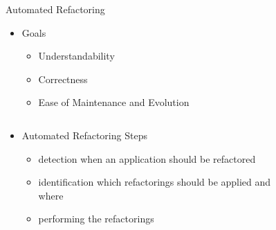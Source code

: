 \documentclass{beamer}
\begin{document}
\begin{frame}{Automated Refactoring}
	\begin{itemize}
		\item Goals
		\begin{itemize}
			\item Understandability
			\item Correctness
			\item Ease of Maintenance and Evolution
		\end{itemize}
	\end{itemize}
	\pause
	\begin{columns}[T]
		\begin{column}{.5\textwidth}
			\begin{itemize}
				\item Automated Refactoring Steps
				\begin{itemize}
					\item detection when an application should be refactored
					\item identification which refactorings should be applied and where
					\item performing the refactorings
				\end{itemize}
			\end{itemize}
		\end{column}
		\begin{column}{.5\textwidth}
			\begin{figure}[t]
				\centering
			\end{figure}
		\end{column}
	\end{columns}	
\end{frame}
\end{document}
